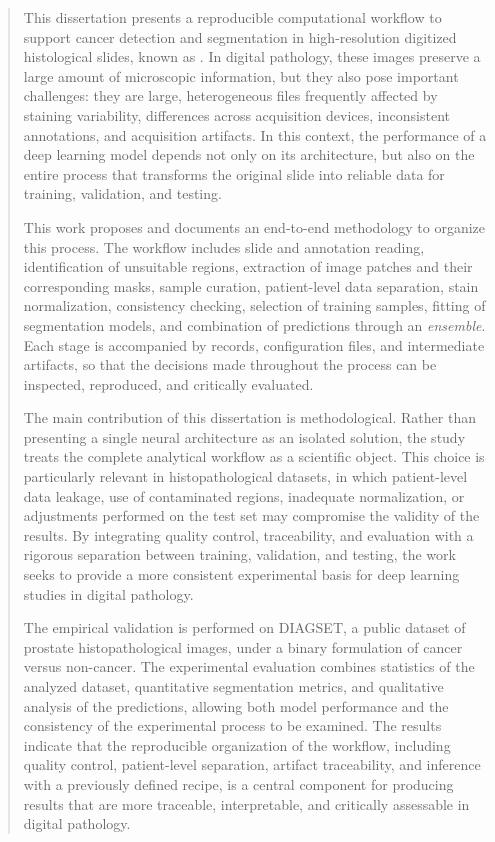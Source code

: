 \begin{abstract} This dissertation presents a reproducible computational workflow to support cancer detection and segmentation in high-resolution digitized histological slides, known as . In digital pathology, these images preserve a large amount of microscopic information, but they also pose important challenges: they are large, heterogeneous files frequently affected by staining variability, differences across acquisition devices, inconsistent annotations, and acquisition artifacts. In this context, the performance of a deep learning model depends not only on its architecture, but also on the entire process that transforms the original slide into reliable data for training, validation, and testing. 

This work proposes and documents an end-to-end methodology to organize this process. The workflow includes slide and annotation reading, identification of unsuitable regions, extraction of image patches and their corresponding masks, sample curation, patient-level data separation, stain normalization, consistency checking, selection of training samples, fitting of segmentation models, and combination of predictions through an \textit{ensemble}. Each stage is accompanied by records, configuration files, and intermediate artifacts, so that the decisions made throughout the process can be inspected, reproduced, and critically evaluated. 

The main contribution of this dissertation is methodological. Rather than presenting a single neural architecture as an isolated solution, the study treats the complete analytical workflow as a scientific object. This choice is particularly relevant in histopathological datasets, in which patient-level data leakage, use of contaminated regions, inadequate normalization, or adjustments performed on the test set may compromise the validity of the results. By integrating quality control, traceability, and evaluation with a rigorous separation between training, validation, and testing, the work seeks to provide a more consistent experimental basis for deep learning studies in digital pathology. 

The empirical validation is performed on DIAGSET, a public dataset of prostate histopathological images, under a binary formulation of cancer versus non-cancer. The experimental evaluation combines statistics of the analyzed dataset, quantitative segmentation metrics, and qualitative analysis of the predictions, allowing both model performance and the consistency of the experimental process to be examined. The results indicate that the reproducible organization of the workflow, including quality control, patient-level separation, artifact traceability, and inference with a previously defined recipe, is a central component for producing results that are more traceable, interpretable, and critically assessable in digital pathology. \end{abstract}

